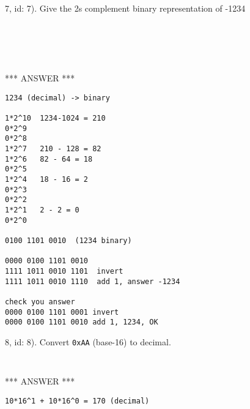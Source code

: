 \documentclass[fleqn]{article}
\begin{document}
7, id: 7).  Give the 2s complement binary representation of -1234
\begin{verbatim}





\end{verbatim}

*** ANSWER ***

\begin{verbatim}
1234 (decimal) -> binary

1*2^10  1234-1024 = 210
0*2^9
0*2^8
1*2^7   210 - 128 = 82
1*2^6   82 - 64 = 18
0*2^5
1*2^4   18 - 16 = 2
0*2^3
0*2^2
1*2^1   2 - 2 = 0
0*2^0   

0100 1101 0010  (1234 binary)

0000 0100 1101 0010
1111 1011 0010 1101  invert
1111 1011 0010 1110  add 1, answer -1234

check you answer
0000 0100 1101 0001 invert
0000 0100 1101 0010 add 1, 1234, OK
\end{verbatim}

8, id: 8).  Convert \verb+0xAA+ (base-16) to decimal.
\begin{verbatim}


\end{verbatim}

*** ANSWER ***

\begin{verbatim}
10*16^1 + 10*16^0 = 170 (decimal)
\end{verbatim}
\end{document}
